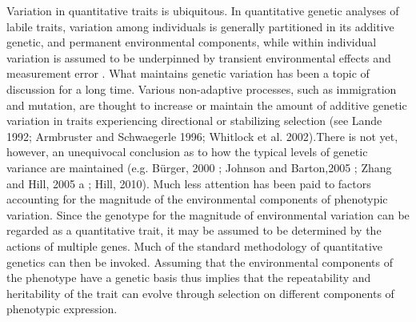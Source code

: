 \documentclass{article}
\begin{document}
Variation in quantitative traits is ubiquitous. In quantitative genetic analyses of labile traits, variation among individuals is generally partitioned in its additive genetic, and permanent environmental components, while within individual variation is assumed to be underpinned by transient environmental effects and measurement error \citep{Lynch1998}. What maintains genetic variation has been a topic of discussion for a long time. Various non-adaptive processes, such as immigration and mutation, are thought to increase or maintain the amount of additive genetic variation in traits experiencing directional or stabilizing selection (see Lande 1992; Armbruster and Schwaegerle 1996; Whitlock et al. 2002).There is not yet, however, an unequivocal conclusion as to how the typical levels of genetic variance are maintained (e.g. Bürger, 2000 ; Johnson and Barton,2005 ; Zhang and Hill, 2005 a ; Hill, 2010). Much less attention has been paid to factors accounting for the magnitude of the environmental components of phenotypic variation. Since the genotype for the magnitude of environmental variation can be regarded as a quantitative trait, it may be assumed to be determined by the actions of multiple genes. Much of the standard methodology of quantitative genetics can then be invoked. Assuming that the environmental components of the phenotype have a genetic basis thus implies that the repeatability and heritability of the trait can evolve through selection on different components of phenotypic expression.
\end{document}
